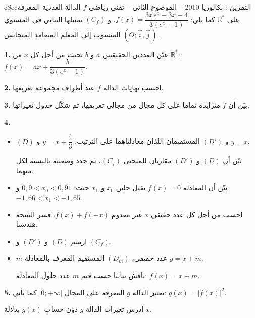 \documentclass[12pt,a4paper]{article}
\newenvironment{BOX}[2]{\begin{otherlanguage}{english}\begin{arbox}{#1}{#2}}{\end{arbox}\end{otherlanguage}}
\newcounter{exo}
\newenvironment{tamrin}[1]{\stepcounter{exo}\begin{BOX}{cSec}{التمرين \theexo: #1}}{\end{BOX}}
\newcommand{\R}{\mathbb{R}}
\newenvironment{sq}{\begin{itemize}[leftmargin=2.4em,itemsep=3pt]}{\end{itemize}}
\newcommand{\qa}{\item[(أ)]}\newcommand{\qb}{\item[(ب)]}\newcommand{\qc}{\item[(جـ)]}\newcommand{\qd}{\item[(د)]}\newcommand{\qe}{\item[(هـ)]}
\newcommand{\QQ}[1]{\par\smallskip\textbf{#1.} }
\begin{document}
\begin{tamrin}{بكالوريا 2010 -- الموضوع الثاني -- تقني رياضي}
$f$ الدالة العددية المعرفة على $\R^*$ كما يلي: $f(x)=\dfrac{3xe^{x}-3x-4}{3\left(e^{x}-1\right)}$،
و $(C_f)$ تمثيلها البياني في المستوي المنسوب إلى المعلم المتعامد المتجانس $(O;\vec i,\vec j)$.
\QQ{1} عيّن العددين الحقيقيين $a$ و $b$ بحيث من أجل كل $x$ من $\R^*$: $f(x)=ax+\dfrac{b}{3\left(e^{x}-1\right)}$.
\QQ{2} احسب نهايات الدالة $f$ عند أطراف مجموعة تعريفها.
\QQ{3} بيّن أن $f$ متزايدة تماما على كل مجال من مجالي تعريفها، ثم شكّل جدول تغيراتها.
\QQ{4}
\begin{sq}
\qa $(D)$ و $(D')$ المستقيمان اللذان معادلتاهما على الترتيب: $y=x+\dfrac43$ و $y=x$.
\par بيّن أن $(D)$ و $(D')$ مقاربان للمنحنى $(C_f)$، ثم حدد وضعيته بالنسبة لكل منهما.
\qb بيّن أن المعادلة $f(x)=0$ تقبل حلين $x_0$ و $x_1$ حيث: $0{,}9<x_0<0{,}91$ و $-1{,}66<x_1<-1{,}65$.
\qc احسب من أجل كل عدد حقيقي $x$ غير معدوم $f(x)+f(-x)$. فسر النتيجة هندسيا.
\qd ارسم $(D)$ و $(D')$ و $(C_f)$.
\qe $m$ عدد حقيقي، $(D_m)$ المستقيم المعرف بالمعادلة $y=x+m$.
\par ناقش بيانيا حسب قيم $m$ عدد حلول المعادلة: $f(x)=x+m$.
\end{sq}
\QQ{5} نعتبر الدالة $g$ المعرفة على المجال $]0;+\infty[$ كما يأتي: $g(x)=\big[f(x)\big]^2$.
\par ادرس تغيرات الدالة $g$ دون حساب $g(x)$ بدلالة $x$.
\end{tamrin}
\end{document}
